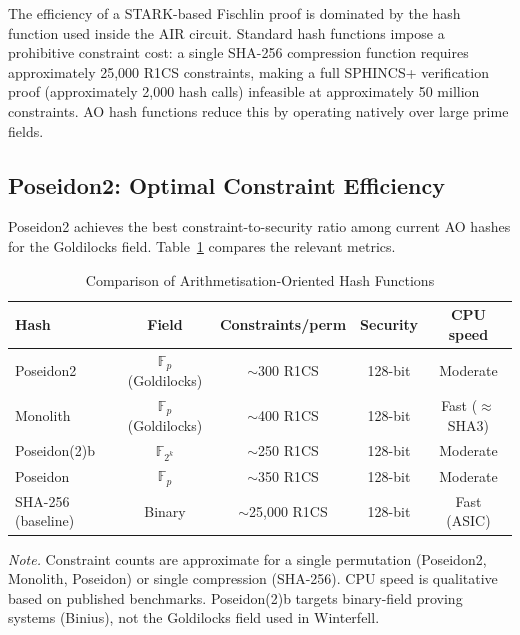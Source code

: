 \documentclass[11pt,a4paper]{article}
\newcommand{\Fp}{\mathbb{F}_p}
\begin{document}
The efficiency of a STARK-based Fischlin proof is dominated by the hash function used inside
the AIR circuit.  Standard hash functions impose a prohibitive constraint cost: a single SHA-256
compression function requires approximately 25,000 R1CS constraints, making a full SPHINCS+
verification proof (approximately 2,000 hash calls) infeasible at approximately 50 million
constraints.  AO hash functions reduce this by operating natively over large prime fields.

\subsection{Poseidon2: Optimal Constraint Efficiency}

Poseidon2 \cite{Grassi2023Poseidon2} achieves the best constraint-to-security ratio among
current AO hashes for the Goldilocks field.  Table~\ref{tab:hashcompare} compares the relevant
metrics.

\begin{table}[t]
\centering
\caption{Comparison of Arithmetisation-Oriented Hash Functions}
\label{tab:hashcompare}
\begin{threeparttable}
\begin{tabular}{lcccc}
\toprule
\textbf{Hash} & \textbf{Field} & \textbf{Constraints/perm} & \textbf{Security} & \textbf{CPU speed} \\
\midrule
Poseidon2 \cite{Grassi2023Poseidon2} & $\Fp$ (Goldilocks) & $\sim$300 R1CS & 128-bit & Moderate \\
Monolith \cite{Grassi2024Monolith} & $\Fp$ (Goldilocks) & $\sim$400 R1CS & 128-bit & Fast ($\approx$SHA3) \\
Poseidon(2)b \cite{Grassi2026Poseidon2b} & $\mathbb{F}_{2^k}$ & $\sim$250 R1CS & 128-bit & Moderate \\
Poseidon \cite{Grassi2019Poseidon} & $\Fp$ & $\sim$350 R1CS & 128-bit & Moderate \\
SHA-256 (baseline) & Binary & $\sim$25,000 R1CS & 128-bit & Fast (ASIC) \\
\bottomrule
\end{tabular}
\begin{tablenotes}
\small
\item \emph{Note.}  Constraint counts are approximate for a single permutation (Poseidon2,
Monolith, Poseidon) or single compression (SHA-256).  CPU speed is qualitative based on
published benchmarks.  Poseidon(2)b targets binary-field proving systems (Binius), not the
Goldilocks field used in Winterfell.
\end{tablenotes}
\end{threeparttable}
\end{table}
\end{document}
